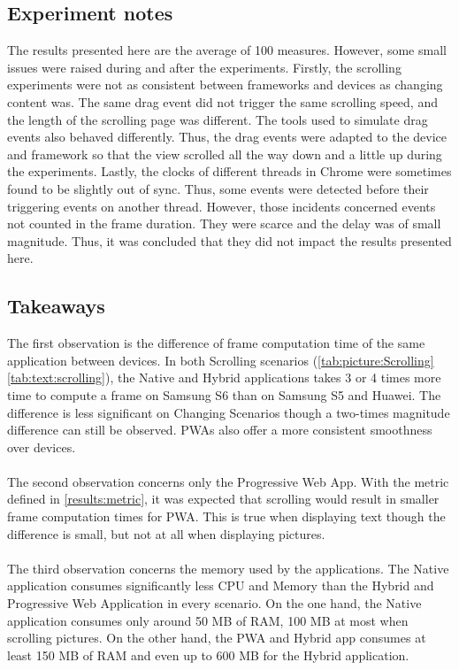 \documentclass{kththesis}
\begin{document}
\subsection{Experiment notes}
The results presented here are the average of 100 measures. However, some small issues were raised during and after the experiments.\newline
Firstly, the scrolling experiments were not as consistent between frameworks and devices as changing content was. The same drag event did not trigger the same scrolling speed, and the length of the scrolling page was different. The tools used to simulate drag events also behaved  differently. Thus, the drag events were adapted to the device and framework so that the view scrolled all the way down and a little up during the experiments. \newline
Lastly, the clocks of different threads in Chrome were sometimes found to be slightly out of sync. Thus, some events were detected before their triggering events on another thread. However, those incidents concerned events not counted in the frame duration. They were scarce and the delay was of small magnitude. Thus, it was concluded that they did not impact the results presented here.

\subsection{Takeaways}
\label{results:performance}
The first observation is the difference of frame computation time of the same application between devices. In both Scrolling scenarios (\autoref{tab:picture:Scrolling} \autoref{tab:text:scrolling}), the Native and Hybrid applications takes 3 or 4 times more time to compute a frame on Samsung S6 than on Samsung S5 and Huawei. The difference is less significant on Changing Scenarios though a two-times magnitude difference can still be observed. PWAs also offer a more consistent smoothness over devices.
\paragraph{}
The second observation concerns only the Progressive Web App. With the metric defined in \autoref{results:metric}, it was expected that scrolling would result in smaller frame computation times for PWA. This is true when displaying text though the difference is small, but not at all when displaying pictures. 

\paragraph{}
The third observation concerns the memory used by the applications. The Native application consumes significantly less CPU and Memory than the Hybrid and Progressive Web Application in every scenario. On the one hand, the Native application consumes only around 50 MB of RAM, 100 MB at most when scrolling pictures. On the other hand, the PWA and Hybrid app consumes at least 150 MB of RAM and even up to 600 MB for the Hybrid application.
\end{document}
